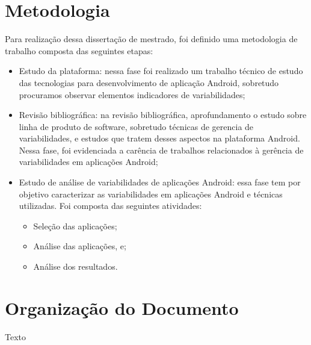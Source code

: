 \section{Metodologia}

Para realização dessa dissertação de mestrado, foi definido uma metodologia de trabalho
composta das seguintes etapas:
\begin{itemize}
    \item Estudo da plataforma: nessa fase foi realizado um trabalho técnico de
          estudo das tecnologias para desenvolvimento de aplicação Android, sobretudo
          procuramos observar elementos indicadores de variabilidades;
    \item Revisão bibliográfica: na revisão bibliográfica, aprofundamento o estudo
          sobre linha de produto de software, sobretudo técnicas de gerencia de
          variabilidades, e estudos que tratem desses aspectos na plataforma Android.
          Nessa fase, foi evidenciada a carência de trabalhos relacionados à gerência
          de variabilidades em aplicações Android;
    \item Estudo de análise de variabilidades de aplicações Android: essa fase tem
          por objetivo caracterizar as variabilidades em aplicações Android e
          técnicas utilizadas. Foi composta das seguintes atividades:
         \begin{itemize}
            \item Seleção das aplicações;
            \item Análise das aplicações, e;
            \item Análise dos resultados.
         \end{itemize}
\end{itemize}



\section{Organização do Documento}

Texto
